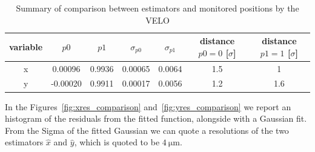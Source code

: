 \begin{table}
    \centering
    \begin{tabular}{c|c|c|c|c|c|c}
    variable  & $p0$ & $p1$ & $\sigma_{p0}$ & $\sigma_{p1}$ & distance $p0=0$ [$\sigma$] & distance $p1=1$ [$\sigma$]\\
    \hline
       x  & 0.00096 & 0.9936 & 0.00065 & 0.0064 & 1.5 & 1\\
       y  & -0.00020 & 0.9911 & 0.00017 & 0.0056 & 1.2 & 1.6 
    \end{tabular}
    \caption{Summary of comparison between estimators and monitored positions by the VELO}
    \label{tab:summary}
\end{table}

In the Figures~\ref{fig:xres_comparison} and~\ref{fig:yres_comparison} we report an histogram of the residuals from the fitted function, alongside with a Gaussian fit. From the Sigma of the fitted Gaussian we can quote a resolutions of the two estimators $\hat{x}$ and $\hat{y}$, which is quoted to be $\SI{4}{\micro\meter}$.

